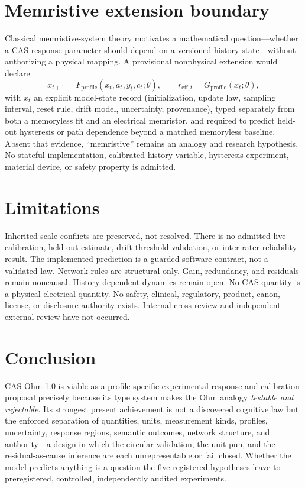 \documentclass[11pt]{amsart}
\theoremstyle{definition}
\theoremstyle{remark}
\begin{document}
\section{Memristive extension boundary}

Classical memristive-system theory \cite{chua71,chuakang76} motivates a mathematical question---whether a CAS response parameter should depend on a versioned history state---without authorizing a physical mapping. A provisional nonphysical extension would declare
\[
x_{t+1} = F_{\mathrm{profile}}(x_t, a_t, y_t, c_t;\theta), \qquad
r_{\mathrm{eff},t} = G_{\mathrm{profile}}(x_t;\theta),
\]
with $x_t$ an explicit model-state record (initialization, update law, sampling interval, reset rule, drift model, uncertainty, provenance), typed separately from both a memoryless fit and an electrical memristor, and required to predict held-out hysteresis or path dependence beyond a matched memoryless baseline. Absent that evidence, ``memristive'' remains an analogy and research hypothesis. No stateful implementation, calibrated history variable, hysteresis experiment, material device, or safety property is admitted.

\section{Limitations}

Inherited scale conflicts are preserved, not resolved. There is no admitted live calibration, held-out estimate, drift-threshold validation, or inter-rater reliability result. The implemented prediction is a guarded software contract, not a validated law. Network rules are structural-only. Gain, redundancy, and residuals remain noncausal. History-dependent dynamics remain open. No CAS quantity is a physical electrical quantity. No safety, clinical, regulatory, product, canon, license, or disclosure authority exists. Internal cross-review and independent external review have not occurred.

\section{Conclusion}

CAS-Ohm 1.0 is viable as a profile-specific experimental response and calibration proposal precisely because its type system makes the Ohm analogy \emph{testable and rejectable}. Its strongest present achievement is not a discovered cognitive law but the enforced separation of quantities, units, measurement kinds, profiles, uncertainty, response regions, semantic outcomes, network structure, and authority---a design in which the circular validation, the unit pun, and the residual-as-cause inference are each unrepresentable or fail closed. Whether the model predicts anything is a question the five registered hypotheses leave to preregistered, controlled, independently audited experiments.
\end{document}
